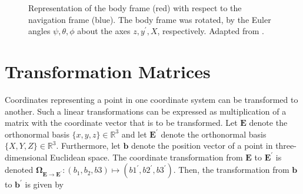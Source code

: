 \begin{figure}[ht]
\centering
{}
\caption{Representation of the body frame (red) with respect to the navigation frame (blue). The body frame was rotated, by the Euler angles $\psi, \theta, \phi$ about the axes $z, y^{'}, X$, respectively. Adapted from \cite{Wiki_taitbryan}.} \label{fig:Euler_angles}
\end{figure}

\section{Transformation Matrices}

Coordinates representing a point in one coordinate system can be transformed to another. Such a linear transformations can be expressed as multiplication of a matrix with the coordinate vector that is to be transformed. Let $\mathbf{E}$ denote the orthonormal basis $\{x, y, z\} \in \mathbb{R}^3$ and let $\mathbf{E}^{'}$ denote the orthonormal basis $\{X, Y, Z\} \in \mathbb{R}^3$. Furthermore, let $\mathbf{b}$ denote the position vector of a point in three-dimensional Euclidean space. The coordinate transformation from $\mathbf{E}$ to $\mathbf{E}^{'}$ is denoted $\mathbf{\Omega}_{\mathbf{E} \rightarrow \mathbf{E}^{'}}: (b_1, b_2, b3) \mapsto (b1^{'}, b2^{'}, b3^{'})$. Then, the transformation from $\mathbf{b}$ to $\mathbf{b}^{'}$ is given by


